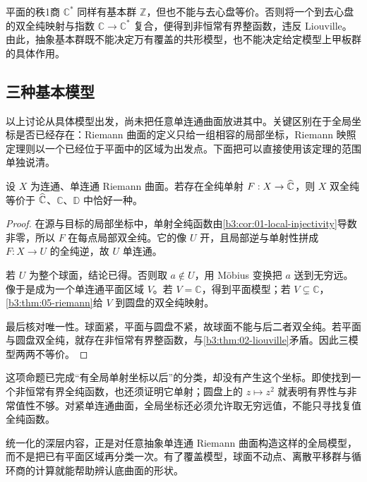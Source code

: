 \ProseParagraphBreak
平面的秩1商 \(\mathbb C^*\) 同样有基本群 \(\mathbb Z\)，但也不能与去心盘等价。否则将一个到去心盘的双全纯映射与指数 \(\mathbb C\to\mathbb C^*\) 复合，便得到非恒常有界整函数，违反 Liouville。由此，抽象基本群既不能决定万有覆盖的共形模型，也不能决定给定模型上甲板群的具体作用。

\subsection{三种基本模型}
\label{b3:subsec:120104}

以上讨论从具体模型出发，尚未把任意单连通曲面放进其中。关键区别在于全局坐标是否已经存在：Riemann 曲面的定义只给一组相容的局部坐标，Riemann 映照定理则以一个已经位于平面中的区域为出发点。下面把可以直接使用该定理的范围单独说清。

\begin{proposition}[已嵌入球面的单连通曲面]\label{b3:prop:12-embedded-models}
设 \(X\) 为连通、单连通 Riemann 曲面。若存在全纯单射 \(F:X\to\widehat{\mathbb C\kern0pt}\)，则 \(X\) 双全纯等价于 \(\widehat{\mathbb C\kern0pt}\)、\(\mathbb C\)、\(\mathbb D\) 中恰好一种。
\end{proposition}
\begin{proof}
在源与目标的局部坐标中，单射全纯函数由\cref{b3:cor:01-local-injectivity}导数非零，所以 \(F\) 在每点局部双全纯。它的像 \(U\) 开，且局部逆与单射性拼成 \(F:X\to U\) 的全纯逆，故 \(U\) 单连通。

若 \(U\) 为整个球面，结论已得。否则取 \(a\notin U\)，用 Möbius 变换把 \(a\) 送到无穷远。像于是成为一个单连通平面区域 \(V\)。若 \(V=\mathbb C\)，得到平面模型；若 \(V\subsetneq\mathbb C\)，\cref{b3:thm:05-riemann}给 \(V\) 到圆盘的双全纯映射。

最后核对唯一性。球面紧，平面与圆盘不紧，故球面不能与后二者双全纯。若平面与圆盘双全纯，就存在非恒常有界整函数，与\cref{b3:thm:02-liouville}矛盾。因此三模型两两不等价。
\end{proof}
这项命题已完成“有全局单射坐标以后”的分类，却没有产生这个坐标。即使找到一个非恒常有界全纯函数，也还须证明它单射；圆盘上的 \(z\mapsto z^2\) 就表明有界性与非常值性不够。对紧单连通曲面，全局坐标还必须允许取无穷远值，不能只寻找复值全纯函数。

\ProseParagraphBreak
统一化的深层内容，正是对任意抽象单连通 Riemann 曲面构造这样的全局模型，而不是把已有平面区域再分类一次。有了覆盖模型，球面不动点、离散平移群与循环商的计算就能帮助辨认底曲面的形状。
